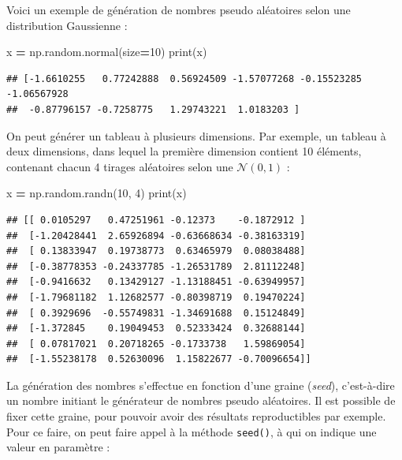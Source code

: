 \documentclass[12pt,]{book}
\newenvironment{Shaded}{\begin{snugshade}}{\end{snugshade}}
\newcommand{\DecValTok}[1]{\textcolor[rgb]{0.00,0.00,0.81}{#1}}
\newcommand{\OperatorTok}[1]{\textcolor[rgb]{0.81,0.36,0.00}{\textbf{#1}}}
\newcommand{\BuiltInTok}[1]{#1}
\newcommand{\NormalTok}[1]{#1}
\numberwithin{equation}{section}
\numberwithin{countremarque}{section}
\begin{document}
Voici un exemple de génération de nombres pseudo aléatoires selon une
distribution Gaussienne :

\begin{Shaded}
\begin{Highlighting}[]
\NormalTok{x }\OperatorTok{=}\NormalTok{ np.random.normal(size}\OperatorTok{=}\DecValTok{10}\NormalTok{)}
\BuiltInTok{print}\NormalTok{(x)}
\end{Highlighting}
\end{Shaded}

\begin{lstlisting}
## [-1.6610255   0.77242888  0.56924509 -1.57077268 -0.15523285 -1.06567928
##  -0.87796157 -0.7258775   1.29743221  1.0183203 ]
\end{lstlisting}

On peut générer un tableau à plusieurs dimensions. Par exemple, un
tableau à deux dimensions, dans lequel la première dimension contient 10
éléments, contenant chacun 4 tirages aléatoires selon une
\(\mathcal{N}(0,1)\) :

\begin{Shaded}
\begin{Highlighting}[]
\NormalTok{x }\OperatorTok{=}\NormalTok{ np.random.randn(}\DecValTok{10}\NormalTok{, }\DecValTok{4}\NormalTok{)}
\BuiltInTok{print}\NormalTok{(x)}
\end{Highlighting}
\end{Shaded}

\begin{lstlisting}
## [[ 0.0105297   0.47251961 -0.12373    -0.1872912 ]
##  [-1.20428441  2.65926894 -0.63668634 -0.38163319]
##  [ 0.13833947  0.19738773  0.63465979  0.08038488]
##  [-0.38778353 -0.24337785 -1.26531789  2.81112248]
##  [-0.9416632   0.13429127 -1.13188451 -0.63949957]
##  [-1.79681182  1.12682577 -0.80398719  0.19470224]
##  [ 0.3929696  -0.55749831 -1.34691688  0.15124849]
##  [-1.372845    0.19049453  0.52333424  0.32688144]
##  [ 0.07817021  0.20718265 -0.1733738   1.59869054]
##  [-1.55238178  0.52630096  1.15822677 -0.70096654]]
\end{lstlisting}

La génération des nombres s'effectue en fonction d'une graine
(\emph{seed}), c'est-à-dire un nombre initiant le générateur de nombres
pseudo aléatoires. Il est possible de fixer cette graine, pour pouvoir
avoir des résultats reproductibles par exemple. Pour ce faire, on peut
faire appel à la méthode \texttt{seed()}, à qui on indique une valeur en
paramètre :
\end{document}

